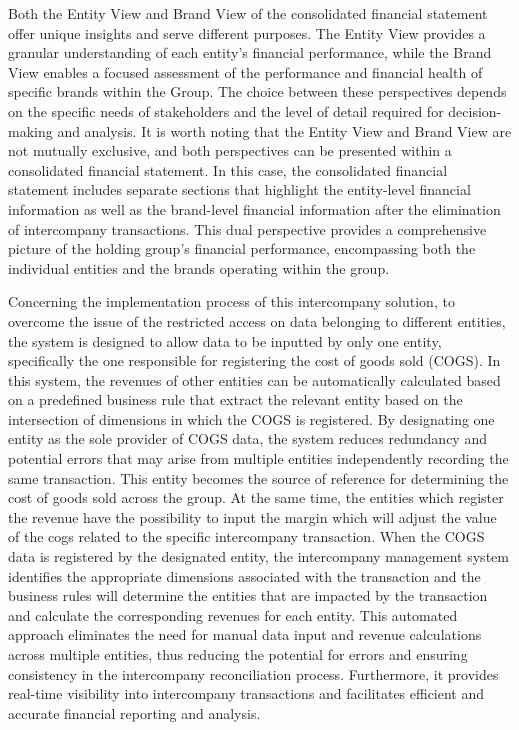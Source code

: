 \documentclass[12pt,a4paper,openright,twoside]{book}
\begin{document}
Both the Entity View and Brand View of the consolidated financial statement offer unique insights and serve different purposes. 
%
The Entity View provides a granular understanding of each entity's financial performance, while the Brand View enables a focused assessment of the performance and financial health of specific brands within the  Group. 
%
The choice between these perspectives depends on the specific needs of stakeholders and the level of detail required for decision-making and analysis.
%
It is worth noting that the Entity View and Brand View are not mutually exclusive, and both perspectives can be presented within a consolidated financial statement. 
%
In this case, the consolidated financial statement includes separate sections that highlight the entity-level financial information as well as the brand-level financial information after the elimination of intercompany transactions. 
%
This dual perspective provides a comprehensive picture of the holding group's financial performance, encompassing both the individual entities and the brands operating within the group.

Concerning the implementation process of this intercompany solution, to overcome the issue of the restricted access on data belonging to different entities, the system is designed to allow data to be inputted by only one entity, specifically the one responsible for registering the cost of goods sold (COGS).
%
In this system, the revenues of other entities can be automatically calculated based on a predefined business rule that extract the relevant entity based on the intersection of dimensions in which the COGS is registered.
%
By designating one entity as the sole provider of COGS data, the system reduces redundancy and potential errors that may arise from multiple entities independently recording the same transaction. 
%
This entity becomes the source of reference for determining the cost of goods sold across the group.
%
At the same time, the entities which register the revenue have the possibility to input the margin which will adjust the value of the cogs related to the specific intercompany transaction.
%
When the COGS data is registered by the designated entity, the intercompany management system identifies the appropriate dimensions associated with the transaction and the business rules will determine the entities that are impacted by the transaction and calculate the corresponding revenues for each entity.
%
This automated approach eliminates the need for manual data input and revenue calculations across multiple entities, thus reducing the potential for errors and ensuring consistency in the intercompany reconciliation process. 
%
Furthermore, it provides real-time visibility into intercompany transactions and facilitates efficient and accurate financial reporting and analysis.
\end{document}
